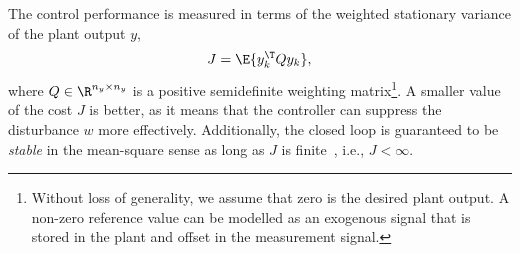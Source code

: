 The control performance is measured in terms of the weighted stationary variance of the plant output $y$,
\begin{equation}
\label{eq:cost}
    J = \E{ y_k^{\T} Q y_k },
\end{equation}
where $Q \in \R^{n_y \times n_y}$ is a positive semidefinite weighting matrix\footnote{Without loss of generality, we assume that zero is the desired plant output. A non-zero reference value can be modelled as an exogenous signal that is stored in the plant and offset in the measurement signal.}.
A smaller value of the cost $J$ is better, as it means that the controller can suppress the disturbance $w$ more effectively.
Additionally, the closed loop is guaranteed to be \emph{stable} in the mean-square sense as long as $J$ is finite~\cite{Fang:2002}, i.e., $J < \infty$.

